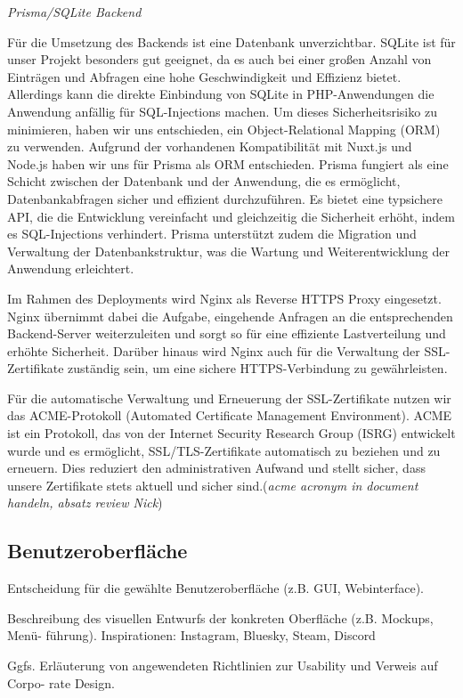 \documentclass[a4paper,12pt]{article}
\begin{document}
\textit{Prisma/SQLite Backend }

Für die Umsetzung des Backends ist eine Datenbank unverzichtbar. SQLite ist für unser Projekt besonders gut geeignet, da es auch bei einer großen Anzahl von Einträgen und Abfragen eine hohe Geschwindigkeit und Effizienz bietet. Allerdings kann die direkte Einbindung von SQLite in PHP-Anwendungen die Anwendung anfällig für SQL-Injections machen. Um dieses Sicherheitsrisiko zu minimieren, haben wir uns entschieden, ein Object-Relational Mapping (ORM) zu verwenden.
Aufgrund der vorhandenen Kompatibilität mit Nuxt.js und Node.js haben wir uns für Prisma als ORM entschieden. Prisma fungiert als eine Schicht zwischen der Datenbank und der Anwendung, die es ermöglicht, Datenbankabfragen sicher und effizient durchzuführen. Es bietet eine typsichere API, die die Entwicklung vereinfacht und gleichzeitig die Sicherheit erhöht, indem es SQL-Injections verhindert. Prisma unterstützt zudem die Migration und Verwaltung der Datenbankstruktur, was die Wartung und Weiterentwicklung der Anwendung erleichtert.

Im Rahmen des Deployments wird Nginx als Reverse HTTPS Proxy eingesetzt. Nginx übernimmt dabei die Aufgabe, eingehende Anfragen an die entsprechenden Backend-Server weiterzuleiten und sorgt so für eine effiziente Lastverteilung und erhöhte Sicherheit. Darüber hinaus wird Nginx auch für die Verwaltung der SSL-Zertifikate zuständig sein, um eine sichere HTTPS-Verbindung zu gewährleisten.

Für die automatische Verwaltung und Erneuerung der SSL-Zertifikate nutzen wir das ACME-Protokoll (Automated Certificate Management Environment). ACME ist ein Protokoll, das von der Internet Security Research Group (ISRG) entwickelt wurde und es ermöglicht, SSL/TLS-Zertifikate automatisch zu beziehen und zu erneuern. Dies reduziert den administrativen Aufwand und stellt sicher, dass unsere Zertifikate stets aktuell und sicher sind.(\textit{acme acronym in document handeln, absatz review Nick})

\subsection{Benutzeroberfläche}
Entscheidung für die gewählte
Benutzeroberfläche (z.B. GUI, Webinterface).

Beschreibung des visuellen Entwurfs der konkreten Oberfläche (z.B. Mockups,
Menü- führung). Inspirationen: Instagram, Bluesky, Steam, Discord 

Ggfs. Erläuterung von angewendeten Richtlinien zur Usability und Verweis auf
Corpo- rate Design.
\end{document}
